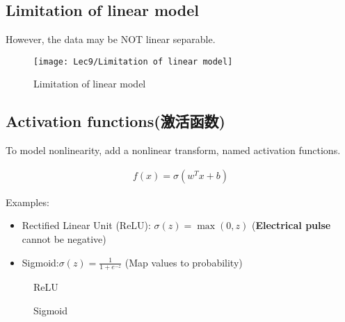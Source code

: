 \subsection{Limitation of linear model}
However, the data may be NOT linear separable. 

\begin{figure}[H]
    \centering
    \texttt{[image: Lec9/Limitation of linear model]}
    \caption{Limitation of linear model}
\end{figure}

\subsection{Activation functions(激活函数)}
To model nonlinearity, add a nonlinear transform, named activation functions. 

\begin{align*}
    f(x)=\sigma(w^T x+b)
\end{align*}

Examples: 
\begin{itemize}
    \item Rectified Linear Unit (ReLU): $\sigma(z)=\max(0,z)$ (\textbf{Electrical pulse} cannot be negative)
    \item Sigmoid:$\sigma(z)=\frac{1}{1+e^{-z}}$ (Map values to probability)
\end{itemize}

\begin{figure}[H]
    \centering
    \begin{minipage}{0.48\textwidth}
        \centering
        \caption{ReLU}
    \end{minipage}
    \begin{minipage}{0.48\textwidth}
        \centering
        \caption{Sigmoid}
    \end{minipage}
\end{figure}

